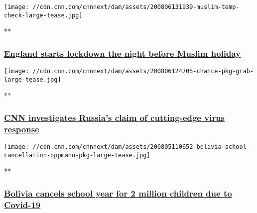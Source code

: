 \href{/videos/world/2020/08/06/england-lockdown-on-eid-eve-muslims-veselinovic-vpx.cnn/video/playlists/coronavirus-intl/}{}

\texttt{[image: //cdn.cnn.com/cnnnext/dam/assets/200806131939-muslim-temp-check-large-tease.jpg]}

**

\hypertarget{england-starts-lockdown-the-night-before-muslim-holiday-1}{%
\subsubsection{\texorpdfstring{\href{/videos/world/2020/08/06/england-lockdown-on-eid-eve-muslims-veselinovic-vpx.cnn/video/playlists/coronavirus-intl/}{England
starts lockdown the night before Muslim
holiday}}{England starts lockdown the night before Muslim holiday}}\label{england-starts-lockdown-the-night-before-muslim-holiday-1}}

\href{/videos/world/2020/08/06/russia-vaccine-testing-matthew-chance-pkg-newday-intl-ldn-vpx.cnn/video/playlists/coronavirus-intl/}{}

\texttt{[image: //cdn.cnn.com/cnnnext/dam/assets/200806124705-chance-pkg-grab-large-tease.jpg]}

**

\hypertarget{cnn-investigates-russias-claim-of-cutting-edge-virus-response}{%
\subsubsection{\texorpdfstring{\href{/videos/world/2020/08/06/russia-vaccine-testing-matthew-chance-pkg-newday-intl-ldn-vpx.cnn/video/playlists/coronavirus-intl/}{CNN
investigates Russia's claim of cutting-edge virus
response}}{CNN investigates Russia's claim of cutting-edge virus response}}\label{cnn-investigates-russias-claim-of-cutting-edge-virus-response}}

\href{/videos/world/2020/08/05/bolivia-schools-closed-coronavirus-covid-19-pandemic-cases-latin-america-oppmann-pkg-intl-ldn-vpx.cnn/video/playlists/coronavirus-intl/}{}

\texttt{[image: //cdn.cnn.com/cnnnext/dam/assets/200805110652-bolivia-school-cancellation-oppmann-pkg-large-tease.jpg]}

**

\hypertarget{bolivia-cancels-school-year-for-2-million-children-due-to-covid-19}{%
\subsubsection{\texorpdfstring{\href{/videos/world/2020/08/05/bolivia-schools-closed-coronavirus-covid-19-pandemic-cases-latin-america-oppmann-pkg-intl-ldn-vpx.cnn/video/playlists/coronavirus-intl/}{Bolivia
cancels school year for 2 million children due to
Covid-19}}{Bolivia cancels school year for 2 million children due to Covid-19}}\label{bolivia-cancels-school-year-for-2-million-children-due-to-covid-19}}

